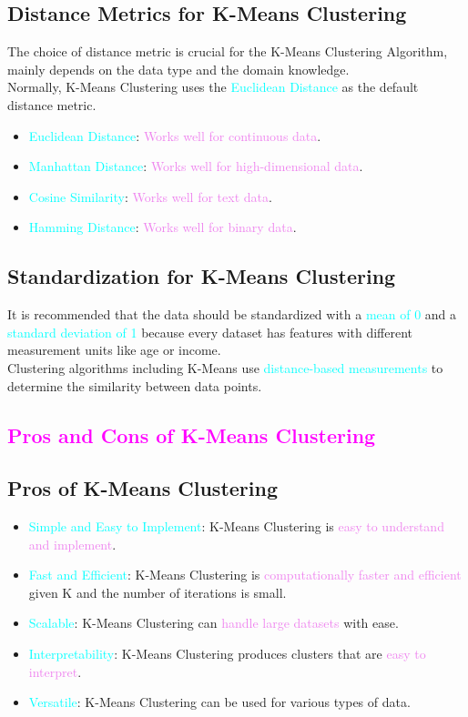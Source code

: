 \documentclass{book}
\begin{document}
\subsection{Distance Metrics for K-Means Clustering}
The choice of distance metric is crucial for the K-Means Clustering Algorithm, mainly depends on the data type and the domain knowledge.\\
Normally, K-Means Clustering uses the \textcolor{cyan}{Euclidean Distance} as the default distance metric.\\
\begin{itemize}
    \item \textcolor{cyan}{Euclidean Distance}: \textcolor{violet}{Works well for continuous data}.
    \item \textcolor{cyan}{Manhattan Distance}: \textcolor{violet}{Works well for high-dimensional data}.
    \item \textcolor{cyan}{Cosine Similarity}: \textcolor{violet}{Works well for text data}.
    \item \textcolor{cyan}{Hamming Distance}: \textcolor{violet}{Works well for binary data}.
\end{itemize}
\subsection{Standardization for K-Means Clustering}
It is recommended that the data should be standardized with a \textcolor{cyan}{mean of 0} and a \textcolor{cyan}{standard deviation of 1} because every dataset has features with different measurement units like age or income.\\
Clustering algorithms including K-Means use \textcolor{cyan}{distance-based measurements} to determine the similarity between data points.\\
\newpage
\textcolor{magenta}{\section{\textbf{Pros and Cons of K-Means Clustering}}}
\subsection{Pros of K-Means Clustering}
\begin{itemize}
    \item \textcolor{cyan}{Simple and Easy to Implement}: K-Means Clustering is \textcolor{violet}{easy to understand and implement}.
    \item \textcolor{cyan}{Fast and Efficient}: K-Means Clustering is \textcolor{violet}{computationally faster and efficient} given K and the number of iterations is small.
    \item \textcolor{cyan}{Scalable}: K-Means Clustering can \textcolor{violet}{handle large datasets} with ease.
    \item \textcolor{cyan}{Interpretability}: K-Means Clustering produces clusters that are \textcolor{violet}{easy to interpret}.
    \item \textcolor{cyan}{Versatile}: K-Means Clustering can be used for various types of data.
\end{itemize}
\end{document}
